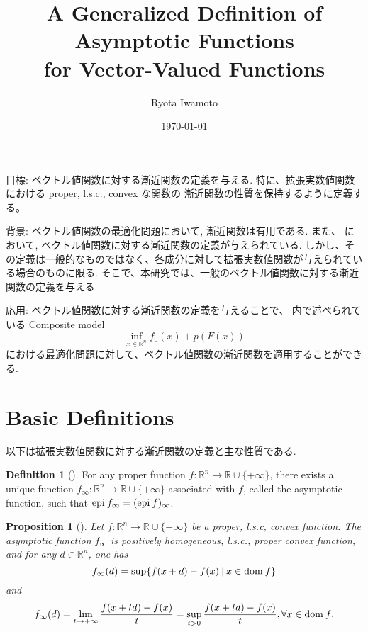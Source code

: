 \documentclass[a4paper,11pt]{jsarticle}
\newtheorem{prop}[thm]{Proposition}
\theoremstyle{definition}
\newtheorem{dfn}[thm]{Definition}
\newcommand{\RealNumberSet}{\mathbb{R}}
\newcommand{\NDemenstionalRealEuclideanSpace}{\mathbb{R}^n}
\newcommand{\Domain}[1]{\text{\rm dom\:${#1}$}} %
\newcommand{\Epigraph}[1]{\text{\rm epi\:${#1}$}} %
\newcommand{\ExtendedRealValuedFunction}[2]{{#1}: {#2} \to \RealNumberSet \cup \{+\infty\}}
\begin{document}
\title{%
  A Generalized Definition of Asymptotic Functions \\
  for Vector-Valued Functions}
\author{Ryota Iwamoto}
\date{\today}
\maketitle

目標: ベクトル値関数に対する漸近関数の定義を与える. 特に、拡張実数値関数における proper, l.s.c., convex な関数の
漸近関数の性質を保持するように定義する。

背景: ベクトル値関数の最適化問題において, 漸近関数は有用である. また、\cite[F. Flores-Baz\'{a}n, R. L\'{o}pez and C. Vera (2024)]{Flores2024} において, ベクトル値関数に対する漸近関数の定義が与えられている.
しかし、その定義は一般的なものではなく、各成分に対して拡張実数値関数が与えられている場合のものに限る. そこで、本研究では、一般のベクトル値関数に対する漸近関数の定義を与える.

応用: ベクトル値関数に対する漸近関数の定義を与えることで、\cite[A.Auslender (1999)]{Auslender99} 内で述べられている Composite model 
\begin{equation}
  \inf_{x \in \mathbb{R}^n} f_0(x) + p(F(x))
\end{equation}
における最適化問題に対して、ベクトル値関数の漸近関数を適用することができる.

\section{Basic Definitions}

以下は拡張実数値関数に対する漸近関数の定義と主な性質である.

\begin{dfn}[\mbox{\cite[p.48 Def 2.5.1]{Auslender03}}]
  For any proper function $\ExtendedRealValuedFunction{f}{\NDemenstionalRealEuclideanSpace}$, there exists a unique function $\ExtendedRealValuedFunction{f_{\infty}}{\NDemenstionalRealEuclideanSpace}$ associated with $f$, called the asymptotic function, such that $\Epigraph{f_\infty} = (\Epigraph{f})_{\infty}$.
\end{dfn}

\begin{prop}[\mbox{\cite[p.50 Prop 2.5.2]{Auslender03}}]
  Let $\ExtendedRealValuedFunction{f}{\NDemenstionalRealEuclideanSpace}$ be a proper, l.s.c, convex function. The asymptotic function $f_{\infty}$ is positively homogeneous, l.s.c., proper convex function, and for any $d \in \NDemenstionalRealEuclideanSpace$, one has
  \begin{equation}
    f_{\infty}(d) = \sup \{f(x+d) -f(x) \:|\: x \in \Domain{f}\}
  \end{equation}
  and
  \begin{equation}
    f_{\infty}(d) = \lim_{t \to +\infty} \frac{f(x+td) -f(x)}{t} = \sup_{t>0} \frac{f(x+td) - f(x)}{t}, \forall x \in \Domain{f}.
  \end{equation}
\end{prop}
\end{document}
